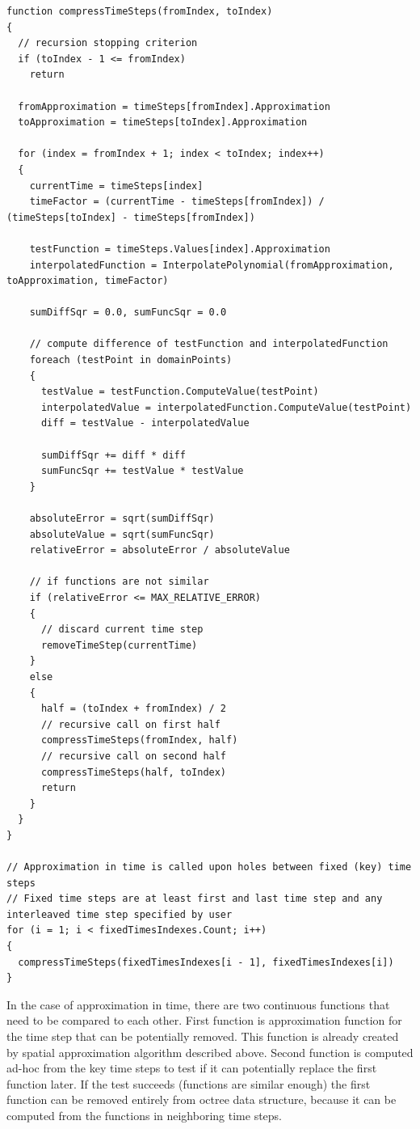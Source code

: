 \begin{lstlisting}[caption=Approximation in time procedure.,label=alg:approximation-in-time]
function compressTimeSteps(fromIndex, toIndex)
{
  // recursion stopping criterion
  if (toIndex - 1 <= fromIndex)
    return

  fromApproximation = timeSteps[fromIndex].Approximation
  toApproximation = timeSteps[toIndex].Approximation
  
  for (index = fromIndex + 1; index < toIndex; index++)
  {
    currentTime = timeSteps[index]
    timeFactor = (currentTime - timeSteps[fromIndex]) / (timeSteps[toIndex] - timeSteps[fromIndex])
    
    testFunction = timeSteps.Values[index].Approximation
    interpolatedFunction = InterpolatePolynomial(fromApproximation, toApproximation, timeFactor)

    sumDiffSqr = 0.0, sumFuncSqr = 0.0

    // compute difference of testFunction and interpolatedFunction
    foreach (testPoint in domainPoints)
    {
      testValue = testFunction.ComputeValue(testPoint)
      interpolatedValue = interpolatedFunction.ComputeValue(testPoint)
      diff = testValue - interpolatedValue
      
      sumDiffSqr += diff * diff
      sumFuncSqr += testValue * testValue
    }

    absoluteError = sqrt(sumDiffSqr)
    absoluteValue = sqrt(sumFuncSqr)
    relativeError = absoluteError / absoluteValue

    // if functions are not similar
    if (relativeError <= MAX_RELATIVE_ERROR)
    {
      // discard current time step
      removeTimeStep(currentTime)
    }
    else
    {
      half = (toIndex + fromIndex) / 2
      // recursive call on first half
      compressTimeSteps(fromIndex, half)
      // recursive call on second half
      compressTimeSteps(half, toIndex)
      return
    }
  }
}

// Approximation in time is called upon holes between fixed (key) time steps
// Fixed time steps are at least first and last time step and any interleaved time step specified by user
for (i = 1; i < fixedTimesIndexes.Count; i++)
{
  compressTimeSteps(fixedTimesIndexes[i - 1], fixedTimesIndexes[i])
}
\end{lstlisting}

In the case of approximation in time, there are two continuous functions that need to be compared to each other. First function is approximation function for the time step that can be potentially removed. This function is already created by spatial approximation algorithm described above. Second function is computed ad-hoc from the key time steps to test if it can potentially replace the first function later. If the test succeeds (functions are similar enough) the first function can be removed entirely from octree data structure, because it can be computed from the functions in neighboring time steps.


